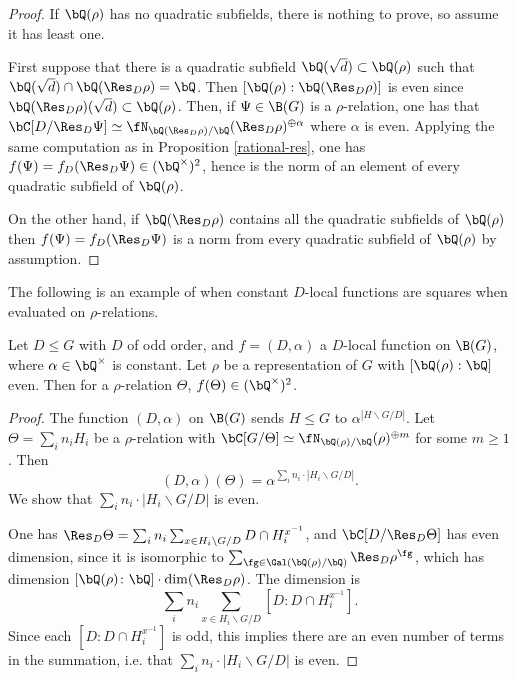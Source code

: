 \begin{proof}
    If $\bQ(\rho)$ has no quadratic subfields, there is nothing to prove, so assume it has least one. 

    First suppose that there is a quadratic subfield $\bQ(\sqrt{d}) \subset \bQ(\rho)$ such that $\bQ(\sqrt{d}) \cap \bQ(\Res_D \rho) = \bQ$. Then $[\bQ(\rho) : \bQ(\Res_D \rho)]$ is even since $\bQ(\Res_D \rho)(\sqrt{d}) \subset \bQ(\rho)$. Then, if $\Psi \in \B(G)$ is a $\rho$-relation, one has that $\bC[ D / \Res_D \Psi] \simeq \repnorm{\Res_D \rho}^{\oplus \alpha}$ where $\alpha$ is even. Applying the same computation as in Proposition \ref{rational-res}, one has $f(\Psi) = f_{D}(\Res_D \Psi) \in (\bQ^{\times})^2$, hence is the norm of an element of every quadratic subfield of $\bQ(\rho)$.
    
    On the other hand, if $\bQ(\Res_D \rho)$ contains all the quadratic subfields of $\bQ(\rho)$ then $f(\Psi) = f_D(\Res_D \Psi)$ is a norm from every quadratic subfield of $\bQ(\rho)$ by assumption.
\end{proof}


The following is an example of when constant $D$-local functions are squares when evaluated on $\rho$-relations.

\begin{prop}\label{const-fns}
     Let $D \leq G$ with $D$ of odd order, and $f = (D, \alpha)$ a $D$-local function on $\B(G)$, where $\alpha \in \bQ^{\times}$ is constant. Let $\rho$ be a representation of $G$ with $[\bQ(\rho) : \bQ ]$ even. Then for a $\rho$-relation $\Theta$, $f(\Theta) \in (\bQ^{\times})^2$. 
\end{prop}

\begin{proof}
    The function $(D, \alpha)$ on $\B(G)$ sends $H \leq G$ to $\alpha^{| H \backslash G / D|}$. Let $\Theta = \sum_i n_i H_i$ be a $\rho$-relation with $\bC[G / \Theta] \simeq \repnorm{\rho}^{\oplus m}$ for some $m \geq 1$. Then $$(D, \alpha)(\Theta) = \alpha^{\sum_i n_i \cdot | H_i \backslash G / D|}.$$ We show that $\sum_i n_i \cdot | H_i \backslash G / D |$ is even.

    One has $\Res_D \Theta = \sum_i n_i \sum_{x \in H_i \backslash G / D} D \cap H_i^{x^{-1}}$, and $\bC[D / \Res_D \Theta]$ has even dimension, since it is isomorphic to $\sum_{\fg \in \Gal(\bQ(\rho) / \bQ)} \Res_D \rho^{\fg}$, which has dimension $[\bQ(\rho) \colon \bQ]\cdot \dim(\Res_D \rho)$. The dimension is $$\sum_i n_i \sum_{x \in H_i \backslash G / D} [D : D \cap H_i^{x^{-1}} ].$$ Since each $[D : D \cap H_i^{x^{-1}} ]$ is odd, this implies there are an even number of terms in the summation, i.e. that $\sum_i n_i \cdot | H_i \backslash G / D|$ is even. 

\end{proof}

